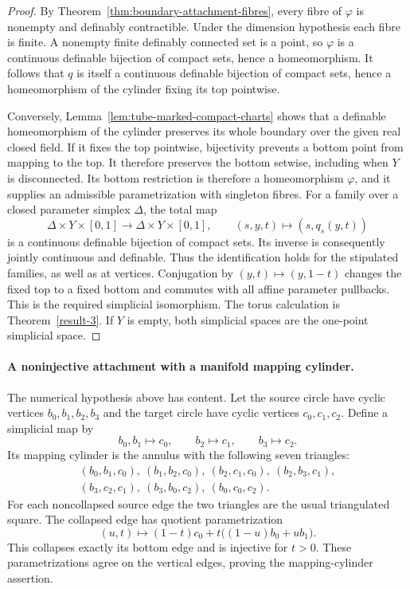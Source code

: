\begin{proof}
By Theorem~\ref{thm:boundary-attachment-fibres}, every fibre of
$\varphi$ is nonempty and definably contractible.  Under the
dimension hypothesis each fibre is finite.  A nonempty finite
definably connected set is a point, so $\varphi$ is a continuous
definable bijection of compact sets, hence a homeomorphism.
It follows that $q$ is itself a continuous definable bijection
of compact sets, hence a homeomorphism of the cylinder fixing
its top pointwise.

Conversely, Lemma~\ref{lem:tube-marked-compact-charts} shows that
a definable homeomorphism of the cylinder preserves its whole
boundary over the given real closed field. If it fixes the top
pointwise, bijectivity prevents a bottom point from mapping to
the top. It therefore preserves the bottom setwise, including
when $Y$ is disconnected.  Its bottom restriction
is therefore a homeomorphism $\varphi$, and it supplies an
admissible parametrization with singleton fibres.  For a family
over a closed parameter simplex $\Delta$, the total map
\[
 \Delta\times Y\times[0,1]\longrightarrow
 \Delta\times Y\times[0,1],\qquad (s,y,t)\longmapsto(s,q_s(y,t))
\]
is a continuous definable bijection of compact sets.  Its inverse
is consequently jointly continuous and definable.  Thus the
identification holds for the stipulated families, as well as at
vertices.  Conjugation by $(y,t)\mapsto(y,1-t)$ changes the fixed
top to a fixed bottom and commutes with all affine parameter
pullbacks.  This is the required simplicial isomorphism.  The
torus calculation is Theorem~\ref{result-3}.  If $Y$ is empty,
both simplicial spaces are the one-point simplicial space.
\end{proof}

\paragraph{A noninjective attachment with a manifold mapping cylinder.}
The numerical hypothesis above has content.  Let the source circle
have cyclic vertices $b_0,b_1,b_2,b_3$ and the target circle have
cyclic vertices $c_0,c_1,c_2$.  Define a simplicial map by
\[
 b_0,b_1\longmapsto c_0,\qquad b_2\longmapsto c_1,\qquad
 b_3\longmapsto c_2.
\]
Its mapping cylinder is the annulus with the following seven
triangles:
\[
\begin{gathered}
 (b_0,b_1,c_0),\ (b_1,b_2,c_0),\ (b_2,c_1,c_0),\
 (b_2,b_3,c_1),\\
 (b_3,c_2,c_1),\ (b_3,b_0,c_2),\ (b_0,c_0,c_2).
\end{gathered}
\]
For each noncollapsed source edge the two triangles are the usual
triangulated square.  The collapsed edge has quotient parametrization
\[
 (u,t)\longmapsto (1-t)c_0+t\bigl((1-u)b_0+ub_1\bigr).
\]
This collapses exactly its bottom edge and is injective for $t>0$.
These parametrizations agree on the vertical edges, proving the
mapping-cylinder assertion.


